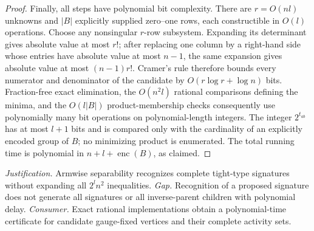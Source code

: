 \documentclass{article}
\begin{document}
\begin{proof}
Finally, all steps have polynomial bit complexity. There are \(r=O(nl)\) unknowns and \(|B|\) explicitly supplied zero--one rows, each constructible in \(O(l)\) operations. Choose any nonsingular \(r\)-row subsystem. Expanding its determinant gives absolute value at most \(r!\); after replacing one column by a right-hand side whose entries have absolute value at most \(n-1\), the same expansion gives absolute value at most \((n-1)r!\). Cramer's rule therefore bounds every numerator and denominator of the candidate by \(O(r\log r+\log n)\) bits. Fraction-free exact elimination, the \(O(n^2l)\) rational comparisons defining the minima, and the \(O(l|B|)\) product-membership checks consequently use polynomially many bit operations on polynomial-length integers. The integer \(2^{t_{ab}}\) has at most \(l+1\) bits and is compared only with the cardinality of an explicitly encoded group of \(B\); no minimizing product is enumerated. The total running time is polynomial in \(n+l+\operatorname{enc}(B)\), as claimed.
\end{proof}
\par\smallskip\noindent \textit{Justification.} Armwise separability recognizes complete tight-type signatures without expanding all \(2^l n^2\) inequalities. \textit{Gap.} Recognition of a proposed signature does not generate all signatures or all inverse-parent children with polynomial delay. \textit{Consumer.} Exact rational implementations obtain a polynomial-time certificate for candidate gauge-fixed vertices and their complete activity sets.
\end{document}
